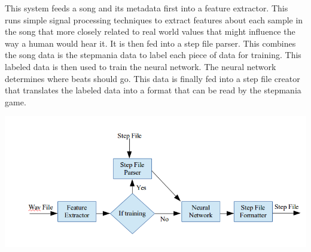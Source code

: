 This system feeds a song and its metadata first into a feature extractor. This runs simple signal processing techniques to extract features about each sample in the song that more closely related to real world values that might influence the way a human would hear it. It is then fed into a step file parser. This combines the song data is the stepmania data to label each piece of data for training. This labeled data is then used to train the neural network. The neural network determines where beats should go. This data is finally fed into a step file creator that translates the labeled data into a format that can be read by the stepmania game.
\begin{center}
	\includegraphics[scale=0.55]{data-flow.png}
\end{center}
